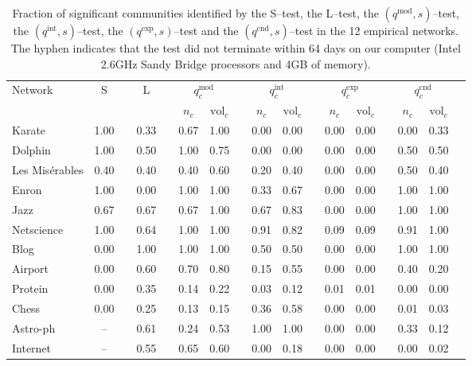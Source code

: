 \documentclass[fleqn,10pt]{wlscirep}
\def\qmod{q^{\text{mod}}}
\def\qint{q^{\text{int}}}
\def\qexp{q^{\text{exp}}}
\def\qcnd{q^{\text{cnd}}}
\def\vol{\text{vol}}
\begin{document}
\clearpage
\begin{table}
\centering
\caption{
Fraction of significant communities identified by the S--test, the L--test, the $(\qmod,s)$--test, the $(\qint,s)$--test,  the $(\qexp,s)$--test and the $(\qcnd,s)$--test in the 12 empirical networks.
The hyphen indicates that the test did not terminate within 64 days on our computer (Intel 2.6GHz Sandy Bridge processors and 4GB of memory).
}
\label{ta:emp_tp}
\setlength{\tabcolsep}{5pt}
\centering
\begin{tabular}{l|cccccccccccccccc}
\multirow{2}{*}{Network} & \multirow{2}{*}{\centering S} && \multirow{2}{*}{\centering L} && \multicolumn{2}{c}{$\qmod_c$}  && \multicolumn{2}{c}{$\qint_c$}  & & \multicolumn{2}{c}{$\qexp_c$} & & \multicolumn{2}{c}{$\qcnd_c$} \\ \cline{6-7} \cline{9-10} \cline{12-13} \cline{15-16}
            &&& & & $n_c$ & $\vol_c$ & & $n_c$ & $\vol_c$  & & $n_c$ & $\vol_c$  & & $n_c$ & $\vol_c$  \\ \hline \hline
Karate              & 1.00 && 0.33 && 0.67 & 1.00 && 0.00 & 0.00 && 0.00 & 0.00 && 0.00 & 0.33\\
Dolphin          & 1.00 && 0.50 && 1.00 & 0.75 && 0.00 & 0.00 && 0.00 & 0.00 && 0.50 & 0.50\\
Les Mis\'{e}rables      & 0.40 && 0.40 && 0.40 & 0.60 && 0.20 & 0.40 && 0.00 & 0.00 && 0.50 & 0.40\\
Enron              & 1.00 && 0.00 && 1.00 & 1.00 && 0.33 & 0.67 && 0.00 & 0.00 && 1.00 & 1.00\\
Jazz              & 0.67 && 0.67 && 0.67 & 1.00 && 0.67 & 0.83 && 0.00 & 0.00 && 1.00 & 1.00\\
Netscience          & 1.00 && 0.64 && 1.00 & 1.00 && 0.91 & 0.82 && 0.09 & 0.09 && 0.91 & 1.00\\
Blog              & 0.00 && 1.00 && 1.00 & 1.00 && 0.50 & 0.50 && 0.00 & 0.00 && 1.00 & 1.00\\
Airport          & 0.00 && 0.60 && 0.70 & 0.80 && 0.15 & 0.55 && 0.00 & 0.00 && 0.40 & 0.20\\
Protein          & 0.00 && 0.35 && 0.14 & 0.22 && 0.03 & 0.12 && 0.01 & 0.01 && 0.00 & 0.00\\
Chess              & 0.00 && 0.25 && 0.13 & 0.15 && 0.36 & 0.58 && 0.00 & 0.00 && 0.01 & 0.03\\
Astro-ph          & --   && 0.61 && 0.24 & 0.53 && 1.00 & 1.00 && 0.00 & 0.00 && 0.33 & 0.12\\
Internet          & --   && 0.55 && 0.65 & 0.60 && 0.00 & 0.18 && 0.00 & 0.00 && 0.00 & 0.02\\ \hline
\end{tabular}
\end{table}
\end{document}
